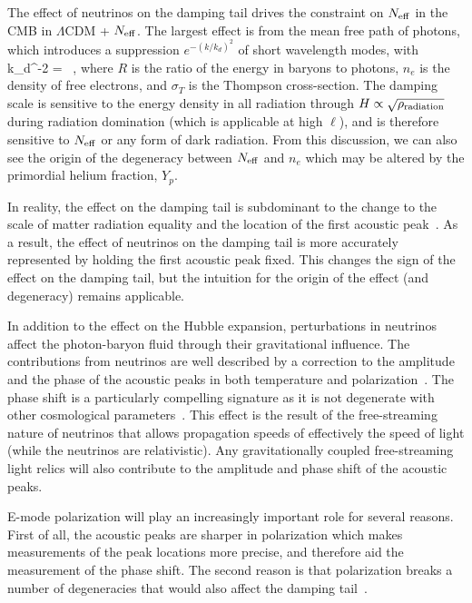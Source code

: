 The effect of neutrinos on the damping tail drives the constraint on $N_{\rm eff}$ in the CMB in $\Lambda$CDM + $N_{\rm eff}$.  The largest effect is from the mean free path of photons, which introduces a suppression $e^{-(k/k_d)^2}$ of short wavelength modes, with~\cite{Zaldarriaga:1995gi}
\beq
k_d^{-2} =\int {}  \ ,
\eeq
where $R$ is the ratio of the energy in baryons to photons, $n_e$ is the density of free electrons, and $\sigma_T$ is the Thompson cross-section.  The damping scale is sensitive to the energy density in all radiation through $H \propto \sqrt{\rho_{\rm radiation}}$ during radiation domination (which is applicable at high $\ell$), and is therefore sensitive to $N_{\rm eff}$ or any form of dark radiation.  From this discussion, we can also see the origin of the degeneracy between $N_{\rm eff}$ and $n_e$ which may be altered by the primordial helium fraction, $Y_p$.

In reality, the effect on the damping tail is subdominant to the change to the scale of matter radiation equality and the location of the first acoustic peak~\cite{Hou:2011ec}.  As a result, the effect of neutrinos on the damping tail is more accurately represented by holding the first acoustic peak fixed.  This changes the sign of the effect on the damping tail, but the intuition for the origin of the effect (and degeneracy) remains applicable.

In addition to the effect on the Hubble expansion, perturbations in neutrinos affect the photon-baryon fluid through their gravitational influence.  The contributions from neutrinos are well described by a correction to the amplitude and the phase of the acoustic peaks in both temperature and polarization~\cite{Bashinsky:2003tk}.  The phase shift is a particularly compelling signature as it is not degenerate with other cosmological parameters~\cite{Bashinsky:2003tk,Baumann:2015rya}.  This effect is the result of the free-streaming nature of neutrinos that allows propagation speeds of effectively the speed of light (while the neutrinos are relativistic).  Any gravitationally coupled free-streaming light relics will also contribute to the amplitude and phase shift of the acoustic peaks.

E-mode polarization will play an increasingly important role for several reasons.  First of all, the acoustic peaks are sharper in polarization which makes measurements of the peak locations more precise, and therefore aid the measurement of the phase shift.  The second reason is that polarization breaks a number of degeneracies that would also affect the damping tail~\cite{Baumann:2015rya}.

